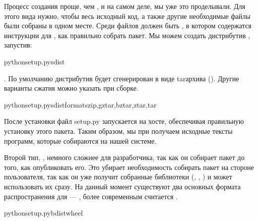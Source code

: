 \documentclass[letterpaper,10pt,russian]{sphinxmanual}
\begin{document}
\sphinxAtStartPar
Процесс создания  проще, чем , и на самом деле, мы уже это проделывали. Для этого вида нужно, чтобы весь исходный код, а также другие необходимые файлы были собраны в одном месте. Среди файлов должен быть , в котором содержатся инструкции для , как правильно собрать пакет. Мы можем создать дистрибутив , запустив:

\begin{sphinxVerbatim}[commandchars=\\\{\}]
pythonsetup.pysdist
\end{sphinxVerbatim}

\sphinxAtStartPar
{}. По умолчанию дистрибутив будет сгенерирован в виде tar\sphinxhyphen{}архива (). Другие варианты сжатия можно указать при сборке.

\begin{sphinxVerbatim}[commandchars=\\\{\}]
pythonsetup.pysdist\PYGZhy{}\PYGZhy{}formatszip,gztar,bztar,ztar,tar
\end{sphinxVerbatim}

\sphinxAtStartPar
После установки  файл setup.py запускается на хосте, обеспечивая правильную установку этого пакета. Таким образом, мы при  получаем исходные тексты программ, которые собираются на нашей системе.

\sphinxAtStartPar
Второй тип, , немного сложнее для разработчика, так как он собирает пакет до того, как опубликовать его. Это убирает необходимость собирать пакет на стороне пользователя, так как он уже получит собранные библиотеки (, , ) и может использовать их сразу. На данный момент существуют два основных формата распространения для  — , более современным считается .

\begin{sphinxVerbatim}[commandchars=\\\{\}]
pythonsetup.pybdist\PYGZus{}wheel
\end{sphinxVerbatim}
\end{document}
